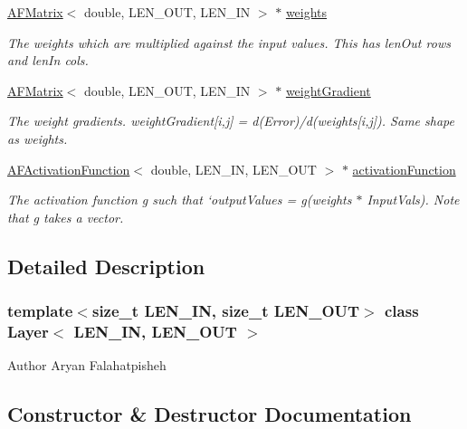 \begin{DoxyCompactItemize}
\hyperlink{class_a_f_matrix}{A\+F\+Matrix}$<$ double, L\+E\+N\+\_\+\+O\+UT, L\+E\+N\+\_\+\+IN $>$ $\ast$ \hyperlink{class_layer_aa362ee5edaf5b0fe8d5d7c4674ded7a1}{weights}
\begin{DoxyCompactList}\small\item\em The weights which are multiplied against the input values. This has {\ttfamily len\+Out} rows and {\ttfamily len\+In} cols. \end{DoxyCompactList}\item 
\hyperlink{class_a_f_matrix}{A\+F\+Matrix}$<$ double, L\+E\+N\+\_\+\+O\+UT, L\+E\+N\+\_\+\+IN $>$ $\ast$ \hyperlink{class_layer_ab4afc6b6fdda2b5fd21621f40be776fd}{weight\+Gradient}
\begin{DoxyCompactList}\small\item\em The weight gradients. {\ttfamily weight\+Gradient\mbox{[}i,j\mbox{]} = d(\+Error)/d(weights\mbox{[}i,j\mbox{]})}. Same shape as {\ttfamily weights}. \end{DoxyCompactList}\item 
\hyperlink{class_a_f_activation_function}{A\+F\+Activation\+Function}$<$ double, L\+E\+N\+\_\+\+IN, L\+E\+N\+\_\+\+O\+UT $>$ $\ast$ \hyperlink{class_layer_aa986af731d3638fe75d0fd93e3481386}{activation\+Function}
\begin{DoxyCompactList}\small\item\em The activation function {\ttfamily g} such that `output\+Values = g(weights $\ast$ Input\+Vals). Note that g takes a vector. \end{DoxyCompactList}\end{DoxyCompactItemize}


\subsection{Detailed Description}
\subsubsection*{template$<$size\+\_\+t L\+E\+N\+\_\+\+IN, size\+\_\+t L\+E\+N\+\_\+\+O\+UT$>$\newline
class Layer$<$ L\+E\+N\+\_\+\+I\+N, L\+E\+N\+\_\+\+O\+U\+T $>$}

\begin{DoxyAuthor}{Author}
Aryan Falahatpisheh 
\end{DoxyAuthor}


\subsection{Constructor \& Destructor Documentation}
\mbox{\label{class_layer_a458cd765beb3e884d631d15e0e6cb690}} 
